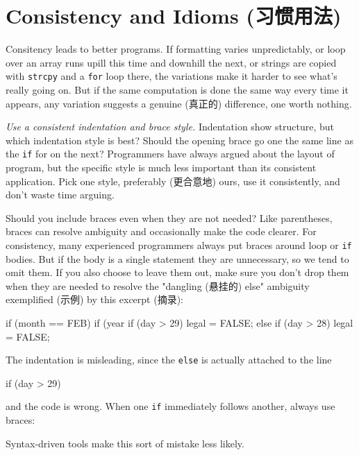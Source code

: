 \section{Consistency and Idioms (习惯用法)}
\label{sec:consist_idom}
Consitency leads to better programs. If formatting varies unpredictably, or
loop over an array runs upill this time and downhill the next, or strings
are copied with \verb'strcpy' and a \verb'for' loop there, the variations
make it harder to see what's really going on. But if the same computation
is done the same way every time it appears, any variation suggests a
genuine (真正的) difference, one worth nothing.

\emph{Use a consistent indentation and brace style.} Indentation show
structure, but which indentation style is best? Should the opening brace go
one the same line as the \verb'if' for on the next? Programmers have always
argued about the layout of program, but the specific style is much less
important than its consistent application. Pick one style,
preferably (更合意地) ours, use it consistently, and don't waste time
arguing.

Should you include braces even when they are not needed? Like parentheses,
braces can resolve ambiguity and occasionally make the code clearer. For
consistency, many experienced programmers always put braces around loop
or \verb'if' bodies. But if the body is a single statement they are
unnecessary, so we tend to omit them. If you also choose to leave them out,
make sure you don't drop them when they are needed to resolve the
"dangling (悬挂的) else" ambiguity exemplified (示例) by this excerpt (摘录):
\begin{badcode}
    if (month == FEB) {
        if (year%
            if (day > 29)
                legal = FALSE;
        else 
            if (day > 28)
                legal = FALSE;
    }
\end{badcode}
The indentation is misleading, since the \verb'else' is actually attached
to the line 
\begin{badcode}
    if (day > 29)
\end{badcode}
and the code is wrong. When one \verb'if' immediately follows another,
always use braces:
Syntax-driven tools make this sort of mistake less likely.

